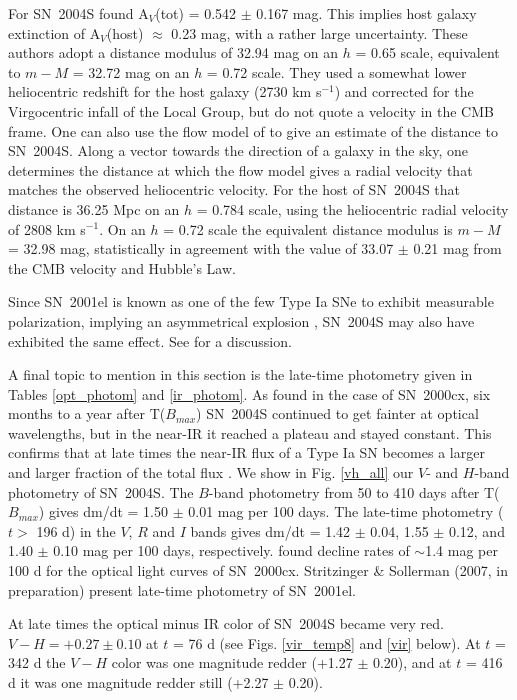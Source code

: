 \documentclass[12pt,preprint,psfig,epsf]{aastex}
\begin{document}
For SN~2004S \citet{Mis_etal05} found A$_V$(tot) = 0.542 $\pm$ 0.167 mag.  This
implies host galaxy extinction of A$_V$(host) $\approx$ 0.23 mag, with a rather
large uncertainty.  These authors adopt a distance modulus of 32.94 mag on an
$h$ = 0.65 scale, equivalent to $m-M$ = 32.72 mag on an $h$ = 0.72 scale.  They
used a somewhat lower heliocentric redshift for the host galaxy (2730 km
s$^{-1}$) and corrected for the Virgocentric infall of the Local Group, but do
not quote a velocity in the CMB frame.  One can also use the flow model of
\citet{Ton_etal00} to give an estimate of the distance to SN~2004S.  Along a
vector towards the direction of a galaxy in the sky, one determines the distance
at which the flow model gives a radial velocity that matches the observed
heliocentric velocity.  For the host of SN~2004S that distance is 36.25 Mpc on an
$h$ = 0.784 scale, using the \citet{The_etal05} heliocentric radial velocity of
2808 km s$^{-1}$.  On an $h$ = 0.72 scale the equivalent distance modulus is
$m-M$ = 32.98 mag, statistically in agreement with the value of 33.07 $\pm$ 0.21
mag from the CMB velocity and Hubble's Law.

Since SN~2001el is known as one of the few Type Ia SNe to exhibit
measurable polarization, implying an asymmetrical explosion
\citep{Wan_etal03b}, SN~2004S may also have exhibited the same effect.
See \citet{Cho_etal06} for a discussion.

A final topic to mention in this section is the late-time photometry given
in Tables \ref{opt_photom} and \ref{ir_photom}.  As \citet{Sol_etal04}
found in the case of SN~2000cx, six months to a year after T($B_{max}$)
SN~2004S continued to get fainter at optical wavelengths, 
but in the near-IR it reached a plateau and stayed constant.  
This confirms that at late times the near-IR flux of a Type Ia SN 
becomes a larger and  larger fraction of the total flux 
\citep[see Fig. 13 of][]{Sol_etal04}.  We show in Fig. \ref{vh_all} 
our $V$- and $H$-band photometry of SN~2004S.  The $B$-band photometry
from 50 to 410 days after T($B_{max}$) gives dm/dt = 1.50 $\pm$ 0.01
mag per 100 days.  The late-time photometry ($t >$ 196 d) in the 
$V$, $R$ and $I$ bands gives dm/dt = 1.42 $\pm$ 0.04,
1.55 $\pm$ 0.12, and
1.40 $\pm$ 0.10 mag per 100 days, respectively.  \citet{Sol_etal04} 
found decline rates of $\sim$1.4 mag per 100 d for the optical 
light curves of SN~2000cx.  Stritzinger \& Sollerman (2007, in preparation)
present late-time photometry of SN~2001el.

At late times the optical minus IR color of SN~2004S became very red.
$V-H = +0.27 \pm 0.10$ at $t$ = 76 d (see Figs. \ref{vir_temp8}
and \ref{vir} below).  At $t$ = 342 d the $V-H$ color was one magnitude redder
(+1.27 $\pm$ 0.20), and at $t$ = 416 d it was one magnitude redder still
(+2.27 $\pm$ 0.20).
\end{document}

